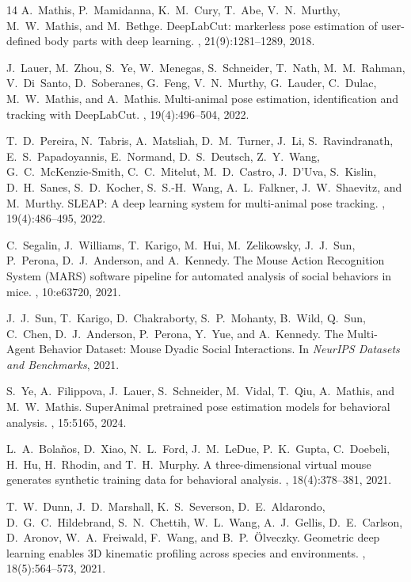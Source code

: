 \documentclass[10pt,twocolumn,letterpaper]{article}
\begin{document}
\clearpage
{\small
\begin{thebibliography}{14}\itemsep=2pt
A.~Mathis, P.~Mamidanna, K.~M.~Cury, T.~Abe, V.~N.~Murthy, M.~W.~Mathis, and M.~Bethge.
\newblock DeepLabCut: markerless pose estimation of user-defined body parts with deep learning.
, 21(9):1281--1289, 2018.

J.~Lauer, M.~Zhou, S.~Ye, W.~Menegas, S.~Schneider, T.~Nath, M.~M.~Rahman, V.~Di~Santo, D.~Soberanes, G.~Feng, V.~N.~Murthy, G.~Lauder, C.~Dulac, M.~W.~Mathis, and A.~Mathis.
\newblock Multi-animal pose estimation, identification and tracking with DeepLabCut.
, 19(4):496--504, 2022.

T.~D.~Pereira, N.~Tabris, A.~Matsliah, D.~M.~Turner, J.~Li, S.~Ravindranath, E.~S.~Papadoyannis, E.~Normand, D.~S.~Deutsch, Z.~Y.~Wang, G.~C.~McKenzie-Smith, C.~C.~Mitelut, M.~D.~Castro, J.~D'Uva, S.~Kislin, D.~H.~Sanes, S.~D.~Kocher, S.~S.-H.~Wang, A.~L.~Falkner, J.~W.~Shaevitz, and M.~Murthy.
\newblock SLEAP: A deep learning system for multi-animal pose tracking.
, 19(4):486--495, 2022.

C.~Segalin, J.~Williams, T.~Karigo, M.~Hui, M.~Zelikowsky, J.~J.~Sun, P.~Perona, D.~J.~Anderson, and A.~Kennedy.
\newblock The Mouse Action Recognition System (MARS) software pipeline for automated analysis of social behaviors in mice.
, 10:e63720, 2021.

J.~J.~Sun, T.~Karigo, D.~Chakraborty, S.~P.~Mohanty, B.~Wild, Q.~Sun, C.~Chen, D.~J.~Anderson, P.~Perona, Y.~Yue, and A.~Kennedy.
\newblock The Multi-Agent Behavior Dataset: Mouse Dyadic Social Interactions.
\newblock In {\em NeurIPS Datasets and Benchmarks}, 2021.

S.~Ye, A.~Filippova, J.~Lauer, S.~Schneider, M.~Vidal, T.~Qiu, A.~Mathis, and M.~W.~Mathis.
\newblock SuperAnimal pretrained pose estimation models for behavioral analysis.
, 15:5165, 2024.

L.~A.~Bola\~{n}os, D.~Xiao, N.~L.~Ford, J.~M.~LeDue, P.~K.~Gupta, C.~Doebeli, H.~Hu, H.~Rhodin, and T.~H.~Murphy.
\newblock A three-dimensional virtual mouse generates synthetic training data for behavioral analysis.
, 18(4):378--381, 2021.

T.~W.~Dunn, J.~D.~Marshall, K.~S.~Severson, D.~E.~Aldarondo, D.~G.~C.~Hildebrand, S.~N.~Chettih, W.~L.~Wang, A.~J.~Gellis, D.~E.~Carlson, D.~Aronov, W.~A.~Freiwald, F.~Wang, and B.~P.~\"Olveczky.
\newblock Geometric deep learning enables 3D kinematic profiling across species and environments.
, 18(5):564--573, 2021.


\end{thebibliography}}
\end{document}
